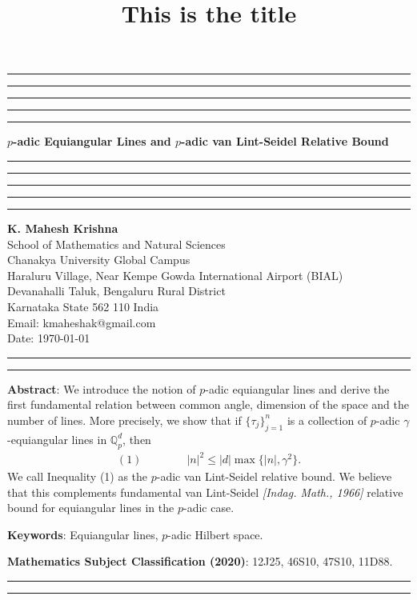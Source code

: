 \documentclass{amsart}
\title{This is the title}
\begin{document}
\hrule\hrule\hrule\hrule\hrule
\vspace{0.3cm}	
\begin{center}
{\bf{$p$-adic Equiangular Lines and  $p$-adic van Lint-Seidel Relative Bound}}\\
\vspace{0.3cm}
\hrule\hrule\hrule\hrule\hrule
\vspace{0.3cm}
\textbf{K. Mahesh Krishna}\\
School of Mathematics and Natural Sciences\\
Chanakya University Global Campus\\
Haraluru Village, Near Kempe Gowda International Airport (BIAL)\\
Devanahalli Taluk, 	Bengaluru  Rural District\\
Karnataka State 562 110 India\\
Email: kmaheshak@gmail.com\\

Date: \today
\end{center}

\hrule\hrule
\vspace{0.5cm}
\textbf{Abstract}: We introduce the notion of $p$-adic equiangular lines and derive the first fundamental relation between common angle,  dimension of the space and the number of  lines. More precisely, we show that if $\{\tau_j\}_{j=1}^n$  is a collection of  $p$-adic  $\gamma$-equiangular lines in $\mathbb{Q}^d_p$, then 
\begin{align*}
(1)	 \quad\quad \quad \quad |n|^2\leq |d|\max\{|n|, \gamma^2 \}.
\end{align*}	
We  call  Inequality (1) as the $p$-adic van Lint-Seidel relative bound. We believe that this complements fundamental van Lint-Seidel  \textit{[Indag. Math., 1966]} relative bound for equiangular lines in the $p$-adic case.

\textbf{Keywords}:   Equiangular lines, $p$-adic Hilbert space.

\textbf{Mathematics Subject Classification (2020)}: 12J25, 46S10, 47S10, 11D88.\\

\hrule


\hrule
\end{document}
